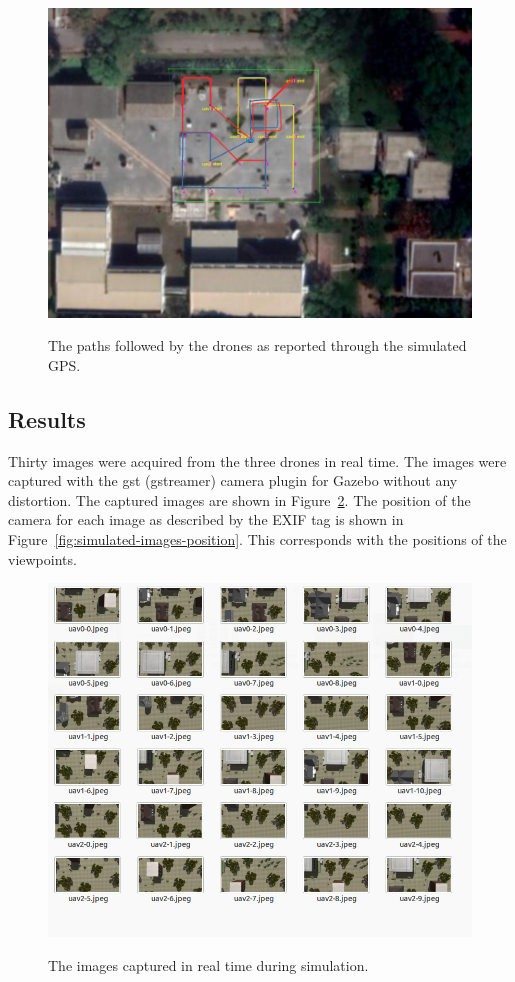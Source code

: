\begin{figure}
	\centering
	\caption[The paths followed by the drones as reported through the simulated GPS.]{\small The paths followed by the drones as reported through the simulated GPS.} 
	\includegraphics[width=5in]{figures/experiment/simulated-path}
	\label{fig:simulated-path}
\end{figure}

\subsection{Results}
Thirty images were acquired from the three drones in real time. The images were captured with the gst (gstreamer) camera plugin for Gazebo without any distortion. The captured images are shown in Figure~\ref{fig:simulated-images}. The position of the camera for each image as described by the EXIF tag is shown in Figure~\ref{fig:simulated-images-position}. This corresponds with the positions of the viewpoints.
\begin{figure}
	\centering
	\caption[The images captures in real time during simulation.]{\small The images captured in real time during simulation.} 
	\includegraphics[width=6in]{figures/experiment/simulated-images}
	\label{fig:simulated-images}
\end{figure}

